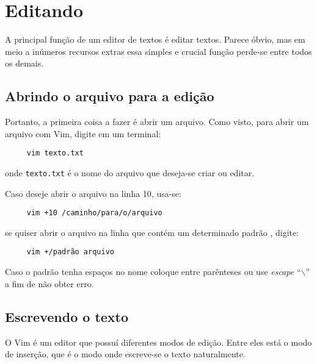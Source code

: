 
\chapter{Editando}
\label{Editando}
A principal função de um editor de textos é editar textos. 
Parece óbvio, mas em meio a inúmeros recursos extras essa simples e crucial função
perde-se entre todos os demais.

\section{Abrindo o arquivo para a edição}
Portanto, a primeira coisa a fazer é abrir um arquivo.
Como visto, para abrir um arquivo com Vim, digite em um terminal:
%
\begin{verbatim}
     vim texto.txt
\end{verbatim}
onde {\tt texto.txt} é o nome do arquivo que deseja-se criar ou editar.

Caso deseje abrir o arquivo na linha 10, usa-se:
\begin{verbatim}
     vim +10 /caminho/para/o/arquivo
\end{verbatim}
se quiser abrir o arquivo na linha que contém um determinado padrão
, digite:
\begin{verbatim}
     vim +/padrão arquivo
\end{verbatim}

{\Large {}} Caso o padrão tenha espaços no nome coloque entre parênteses ou
use {\em escape} ``$\backslash$'' a fim de não obter erro.

\section{Escrevendo o texto}
O Vim é um editor que possuí diferentes modos de edição. Entre eles está o modo
de inserção, que é o modo onde escreve-se o texto naturalmente.


